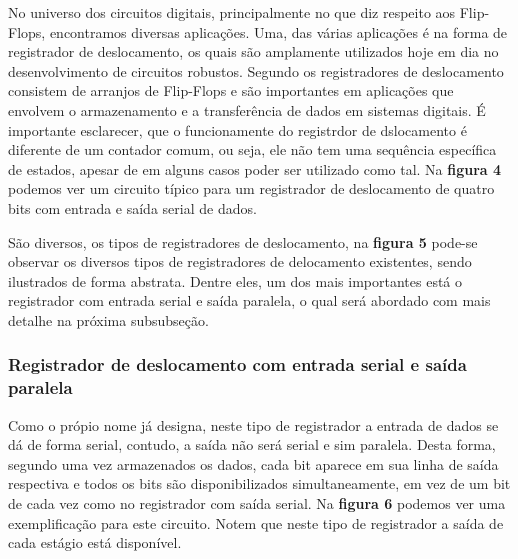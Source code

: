 \documentclass[12pt]{article}
\begin{document}
No universo dos circuitos digitais, principalmente no que diz respeito aos Flip-Flops, encontramos diversas aplicações. Uma, das várias aplicações é na forma de registrador de deslocamento, os quais são amplamente utilizados hoje em dia no desenvolvimento de circuitos robustos. Segundo \cite{floyd2011digital} os registradores de deslocamento consistem de arranjos de Flip-Flops e são importantes em aplicações que envolvem o armazenamento e a transferência de dados em sistemas digitais. É importante esclarecer, que o funcionamente do registrdor de dslocamento é diferente de um contador comum, ou seja, ele não tem uma sequência específica de estados, apesar de em alguns casos poder ser utilizado como tal. Na \textbf{figura 4} podemos ver um circuito típico para um registrador de deslocamento de quatro bits com entrada e saída serial de dados.


São diversos, os tipos de registradores de deslocamento, na \textbf{figura 5} pode-se observar os diversos tipos de registradores de delocamento existentes, sendo ilustrados de forma abstrata. Dentre eles, um dos mais importantes está o registrador com entrada serial e saída paralela, o qual será abordado com mais detalhe na próxima subsubseção.




\subsubsection{Registrador de deslocamento com entrada serial e saída paralela}

Como o própio nome já designa, neste tipo de registrador a entrada de dados se dá de forma serial, contudo, a saída não será serial e sim paralela. Desta forma, segundo \cite{floyd2011digital} uma vez armazenados os dados, cada bit aparece em sua linha de saída respectiva e todos os bits são disponibilizados simultaneamente, em vez de um bit de cada vez como no registrador com saída serial. Na \textbf{figura 6} podemos ver uma exemplificação para este circuito. Notem que neste tipo de registrador a saída de cada estágio está disponível.

\end{document}
